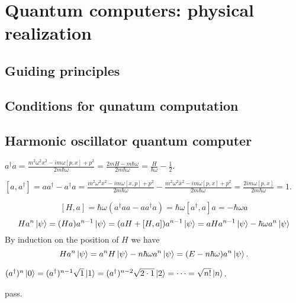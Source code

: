 \chapter{Quantum computers: physical realization}

\section{Guiding principles}

\section{Conditions for qunatum computation}

\section{Harmonic oscillator quantum computer}

\ex $a^\dagger a = \frac{m^2\omega^2x^2-im\omega[p,x]+p^2}{2m\hbar\omega}=\frac{2mH-m\hbar\omega}{2m\hbar\omega} = \frac{H}{\hbar\omega}-\frac{1}{2}$.

\ex $[a,a^\dagger] = aa^\dagger-a^\dagger a = \frac{m^2\omega^2x^2-im\omega[x,p]+p^2}{2m\hbar\omega} - \frac{m^2\omega^2x^2-im\omega[p,x]+p^2}{2m\hbar\omega} = \frac{2im\omega[p,x]}{2m\hbar\omega} = 1$.

\ex $$[H,a] = \hbar\omega(a^\dagger aa-aa^\dagger a) = \hbar\omega[a^\dagger,a]a = -\hbar\omega a$$
$$Ha^n\left|\psi\right\rangle = (Ha)a^{n-1}\left|\psi\right\rangle = (aH + [H,a])a^{n-1}\left|\psi\right\rangle = aHa^{n-1}\left|\psi\right\rangle - \hbar\omega a^n\left|\psi\right\rangle$$
By induction on the position of $H$ we have
$$Ha^n\left|\psi\right\rangle = a^nH\left|\psi\right\rangle - n\hbar\omega a^n\left|\psi\right\rangle = (E-n\hbar\omega)a^n\left|\psi\right\rangle.$$

\ex $(a^\dagger)^n \left|0\right\rangle = (a^\dagger)^{n-1} \sqrt{1}\left|1\right\rangle = (a^\dagger)^{n-2} \sqrt{2\cdot 1}\left|2\right\rangle = \cdots = \sqrt{n!}\left|n\right\rangle$.

\ex pass.